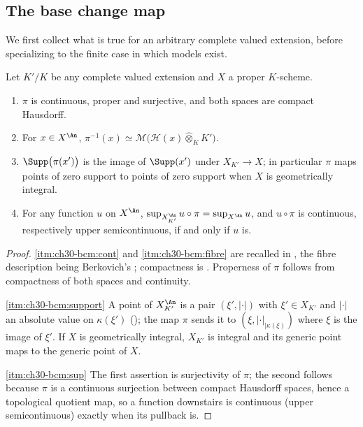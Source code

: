 \subsection{The base change map}
\label{sec:ch30-bc-map}

We first collect what is true for an arbitrary complete valued extension,
before specializing to the finite case in which models exist.

\begin{lemma}
\label{lem:ch30-base-change-map}
Let $K'/K$ be any complete valued extension and $X$ a proper
$K$-scheme.
\begin{enumerate}
\item\label{itm:ch30-bcm:cont}
$\pi$ is continuous, proper and surjective, and both spaces are compact
Hausdorff.
\item\label{itm:ch30-bcm:fibre}
For $x\in X^{\An}$,
$\pi^{-1}(x)\simeq\mathcal M\bigl(\mathcal H(x)\widehat\otimes_KK'\bigr)$.
\item\label{itm:ch30-bcm:support}
$\Supp\bigl(\pi(x')\bigr)$ is the image of $\Supp(x')$ under
$X_{K'}\to X$; in particular $\pi$ maps points of zero support to points
of zero support when $X$ is geometrically integral.
\item\label{itm:ch30-bcm:sup}
For any function $u$ on $X^{\An}$,
$\sup_{X_{K'}^{\An}}u\circ\pi=\sup_{X^{\An}}u$, and $u\circ\pi$ is
continuous, respectively upper semicontinuous, if and only if $u$ is.
\end{enumerate}
\end{lemma}

\begin{proof}
\cref{itm:ch30-bcm:cont} and \cref{itm:ch30-bcm:fibre} are recalled in
, the fibre description being Berkovich's
\cite[\S1.4 and \S3.4]{Berk12}; compactness is
.  Properness of $\pi$ follows from
compactness of both spaces and continuity.

\cref{itm:ch30-bcm:support}  A point of $X_{K'}^{\An}$ is a pair
$(\xi',|\cdot|)$ with $\xi'\in X_{K'}$ and $|\cdot|$ an absolute value
on $\kappa(\xi')$ (); the map $\pi$
sends it to $(\xi,|\cdot|_{|\kappa(\xi)})$ where $\xi$ is the image of
$\xi'$.  If $X$ is geometrically integral, $X_{K'}$ is integral and
its generic point maps to the generic point of $X$.

\cref{itm:ch30-bcm:sup}  The first assertion is surjectivity of $\pi$;
the second follows because $\pi$ is a continuous surjection between
compact Hausdorff spaces, hence a topological quotient map, so a function
downstairs is continuous (upper semicontinuous) exactly when its pullback
is.
\end{proof}


